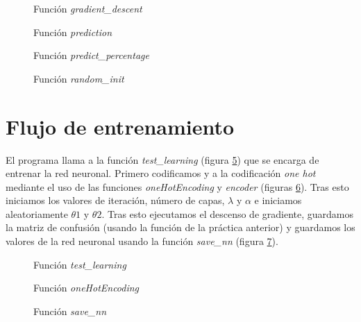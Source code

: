\documentclass[6pt]{AiTex}
\begin{document}
\begin{figure}[H]
    \centering
    
    \caption{Función \textit{gradient\_descent}}
    \label{fig:gradient_descent}
\end{figure}

\begin{figure}[H]
    \centering
    
    \caption{Función \textit{prediction}}
    \label{fig:prediction}
\end{figure}

\begin{figure}[H]
    \centering
    
    \caption{Función \textit{predict\_percentage}}
    \label{fig:predict_percentage}
\end{figure}

\begin{figure}[H]
    \centering
    
    \caption{Función \textit{random\_init}}
    \label{fig:random_init}
\end{figure}

\section{Flujo de entrenamiento}

El programa llama a la función \textit{test\_learning} (figura \ref{fig:train_test}) que se encarga de entrenar la red neuronal. Primero codificamos y a la codificación \textit{one hot} mediante el uso de las funciones \textit{oneHotEncoding} y \textit{encoder} (figuras \ref{fig:oneHotEncoding}). Tras esto iniciamos los valores de iteración, número de capas, $\lambda$ y $\alpha$ e iniciamos aleatoriamente $\theta 1$ y $\theta 2$. Tras esto ejecutamos el descenso de gradiente, guardamos la matriz de confusión (usando la función de la práctica anterior) y guardamos los valores de la red neuronal usando la función \textit{save\_nn} (figura \ref{fig:save_nn}).

\begin{figure}[H]
    \centering
    
    \caption{Función \textit{test\_learning}}
    \label{fig:train_test}
\end{figure}

\begin{figure}[H]
    \centering
    
    \caption{Función \textit{oneHotEncoding}}
    \label{fig:oneHotEncoding}
\end{figure}
\begin{figure}[H]
    \centering
    
    \caption{Función \textit{save\_nn}}
    \label{fig:save_nn}
\end{figure}
\end{document}
